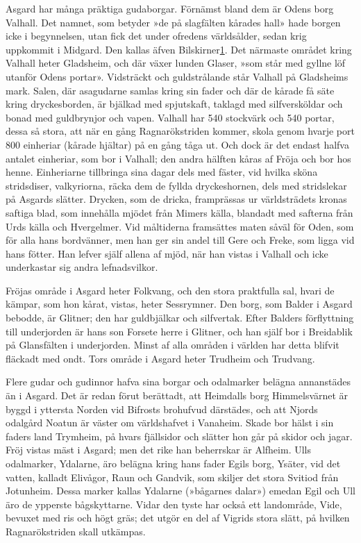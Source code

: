 Asgard har många präktiga gudaborgar. Förnämst bland dem är Odens borg
Valhall. Det namnet, som betyder »de på slagfälten kårades hall» hade
borgen icke i begynnelsen, utan fick det under ofredens världsålder,
sedan krig uppkommit i Midgard. Den kallas äfven
Bilskirner{\protect\hyperlink{lb1625905.xhtmlux5cux23n1}{1}}. Det
närmaste området kring Valhall heter Gladsheim, och där växer lunden
Glaser, »som står med gyllne löf utanför Odens portar». Vidsträckt och
guldstrålande står Valhall på Gladsheims mark. Salen, där asagudarne
samlas kring sin fader och där de kårade få säte kring dryckesborden, är
bjälkad med spjutskaft, taklagd med silfversköldar och bonad med
guldbrynjor och vapen. Valhall har 540 stockvärk och 540 portar, dessa
så stora, att när en gång Ragnarökstriden kommer, skola genom hvarje
port 800 einheriar (kårade hjältar) på en gång
\protect\hypertarget{lb1625905.xhtmlux5cux23start35}{}{}\protect\hypertarget{lb1625905.xhtmlux5cux23start35-a}{}{}\protect\hypertarget{lb1625905.xhtmlux5cux23start35-b}{}{}\protect\hypertarget{lb1625905.xhtmlux5cux23start35-c}{}{}\protect\hypertarget{lb1625905.xhtmlux5cux23start35-d}{}{}
tåga ut. Och dock är det endast halfva antalet einheriar, som bor i
Valhall; den andra hälften kåras af Fröja och bor hos henne. Einheriarne
tillbringa sina dagar dels med fäster, vid hvilka sköna stridsdiser,
valkyriorna, räcka dem de fyllda dryckeshornen, dels med stridslekar på
Asgards slätter. Drycken, som de dricka, framprässas ur världsträdets
kronas saftiga blad, som innehålla mjödet från Mimers källa, blandadt
med safterna från Urds källa och Hvergelmer. Vid måltiderna framsättes
maten såväl för Oden, som för alla hans bordvänner, men han ger sin
andel till Gere och Freke, som ligga vid hans fötter. Han lefver själf
allena af mjöd, när han vistas i Valhall och icke underkastar sig andra
lefnadsvilkor.

Fröjas område i Asgard heter Folkvang, och den stora praktfulla sal,
hvari de kämpar, som hon kårat, vistas, heter Sessrymner. Den borg, som
Balder i Asgard bebodde, är Glitner; den har guldbjälkar och silfvertak.
Efter Balders förflyttning till underjorden är hans son Forsete herre i
Glitner, och han själf bor i Breidablik på Glansfälten i underjorden.
Minst af alla områden i världen har detta blifvit fläckadt med ondt.
Tors område i Asgard heter Trudheim och Trudvang.

Flere gudar och gudinnor hafva sina borgar och odalmarker belägna
annanstädes än i Asgard. Det är redan förut berättadt, att Heimdalls
borg Himmelsvärnet är byggd i yttersta Norden vid Bifrosts brohufvud
därstädes, och att Njords odalgård Noatun är väster om världshafvet i
Vanaheim. Skade bor hälst i sin faders land Trymheim, på hvars
fjällsidor och slätter hon går på skidor och jagar. Fröj vistas mäst i
Asgard; men det rike han beherrskar är Alfheim. Ulls odalmarker,
Ydalarne, äro belägna kring hans fader Egils borg, Ysäter, vid det
vatten, kalladt Elivågor, Raun och Gandvik, som skiljer det stora
Svitiod från Jotunheim. Dessa marker kallas Ydalarne (»bågarnes dalar»)
emedan Egil och Ull äro de ypperste bågskyttarne. Vidar den tyste har
också ett landområde, Vide, bevuxet med ris och högt gräs; det utgör en
del af Vigrids stora slätt, på hvilken Ragnarökstriden skall utkämpas.

